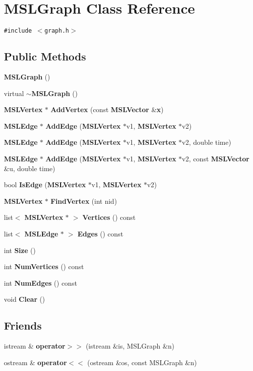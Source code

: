 \section{MSLGraph  Class Reference}
\label{classMSLGraph}
{\tt \#include $<$graph.h$>$}

\subsection*{Public Methods}
\begin{CompactItemize}
\item 
{\bf MSLGraph} ()
\item 
virtual {\bf $\sim$MSLGraph} ()
\item 
{\bf MSLVertex} $\ast$ {\bf Add\-Vertex} (const {\bf MSLVector} \&{\bf x})
\item 
{\bf MSLEdge} $\ast$ {\bf Add\-Edge} ({\bf MSLVertex} $\ast$v1, {\bf MSLVertex} $\ast$v2)
\item 
{\bf MSLEdge} $\ast$ {\bf Add\-Edge} ({\bf MSLVertex} $\ast$v1, {\bf MSLVertex} $\ast$v2, double time)
\item 
{\bf MSLEdge} $\ast$ {\bf Add\-Edge} ({\bf MSLVertex} $\ast$v1, {\bf MSLVertex} $\ast$v2, const {\bf MSLVector} \&u, double time)
\item 
bool {\bf Is\-Edge} ({\bf MSLVertex} $\ast$v1, {\bf MSLVertex} $\ast$v2)
\item 
{\bf MSLVertex} $\ast$ {\bf Find\-Vertex} (int nid)
\item 
list$<$ {\bf MSLVertex} $\ast$ $>$ {\bf Vertices} () const
\item 
list$<$ {\bf MSLEdge} $\ast$ $>$ {\bf Edges} () const
\item 
int {\bf Size} ()
\item 
int {\bf Num\-Vertices} () const
\item 
int {\bf Num\-Edges} () const
\item 
void {\bf Clear} ()
\end{CompactItemize}
\subsection*{Friends}
\begin{CompactItemize}
\item 
istream \& {\bf operator$>$$>$} (istream \&is, MSLGraph \&n)
\item 
ostream \& {\bf operator$<$$<$} (ostream \&os, const MSLGraph \&n)
\end{CompactItemize}


